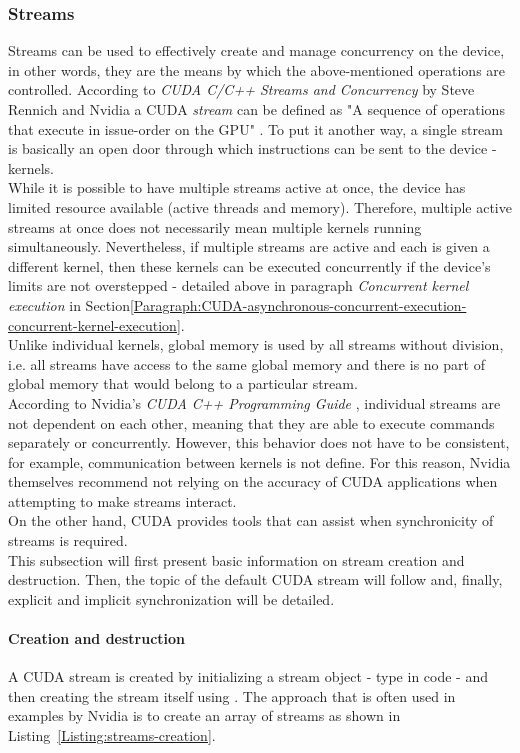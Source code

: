 \subsubsection{Streams \TO}\label{Subsubsection:CUDA-asynchronous-concurrent-execution-concurrent-streams}
Streams can be used to effectively create and manage concurrency on the device, in other words, they are the means by which the above-mentioned operations are controlled. According to \emph{CUDA C/C++ Streams and Concurrency} by Steve Rennich and Nvidia a CUDA \textit{stream} can be defined as "A sequence of operations that execute in issue-order on the GPU" \cite{sk7jHd5INXJOAEUe}. To put it another way, a single stream is basically an open door through which instructions can be sent to the device - kernels. \\
While it is possible to have multiple streams active at once, the device has limited resource available (active threads and memory). Therefore, multiple active streams at once does not necessarily mean multiple kernels running simultaneously. Nevertheless, if multiple streams are active and each is given a different kernel, then these kernels can be executed concurrently if the device's limits are not overstepped - detailed above in paragraph \textit{Concurrent kernel execution} in Section\ref{Paragraph:CUDA-asynchronous-concurrent-execution-concurrent-kernel-execution}. \\
Unlike individual kernels, global memory is used by all streams without division, i.e. all streams have access to the same global memory and there is no part of global memory that would belong to a particular stream. \\
According to Nvidia's \emph{CUDA C++ Programming Guide} \cite{NVIDIAMay2022}, individual streams are not dependent on each other, meaning that they are able to execute commands separately or concurrently. However, this behavior does not have to be consistent, for example, communication between kernels is not define. For this reason, Nvidia themselves recommend not relying on the accuracy of CUDA applications when attempting to make streams interact. \\
On the other hand, CUDA provides tools that can assist when synchronicity of streams is required. \\
This subsection will first present basic information on stream creation and destruction. Then, the topic of the default CUDA stream will follow and, finally, explicit and implicit synchronization will be detailed.

\paragraph{Creation and destruction}
A CUDA stream is created by initializing a stream object - type  in code - and then creating the stream itself using . The approach that is often used in examples by Nvidia is to create an array of streams as shown in Listing~\ref{Listing:streams-creation}.


